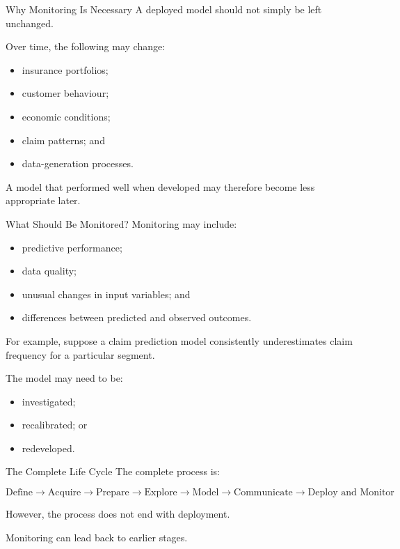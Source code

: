 \documentclass[
  ignorenonframetext,
  aspectratio=169,
]{beamer}
\providecommand{\tightlist}{%
  \setlength{\itemsep}{0pt}\setlength{\parskip}{0pt}}
\begin{document}
\begin{frame}{Why Monitoring Is Necessary}
\protect{}\label{why-monitoring-is-necessary}
A deployed model should not simply be left unchanged.

Over time, the following may change:

\begin{itemize}
\tightlist
\item
  insurance portfolios;
\item
  customer behaviour;
\item
  economic conditions;
\item
  claim patterns; and
\item
  data-generation processes.
\end{itemize}

A model that performed well when developed may therefore become less
appropriate later.
\end{frame}

\begin{frame}{What Should Be Monitored?}
\protect{}\label{what-should-be-monitored}
Monitoring may include:

\begin{itemize}
\tightlist
\item
  predictive performance;
\item
  data quality;
\item
  unusual changes in input variables; and
\item
  differences between predicted and observed outcomes.
\end{itemize}

For example, suppose a claim prediction model consistently
underestimates claim frequency for a particular segment.

The model may need to be:

\begin{itemize}
\tightlist
\item
  investigated;
\item
  recalibrated; or
\item
  redeveloped.
\end{itemize}
\end{frame}

\begin{frame}{The Complete Life Cycle}
\protect{}\label{the-complete-life-cycle}
The complete process is:

\[
\boxed{
\text{Define}
\rightarrow
\text{Acquire}
\rightarrow
\text{Prepare}
\rightarrow
\text{Explore}
\rightarrow
\text{Model}
\rightarrow
\text{Communicate}
\rightarrow
\text{Deploy and Monitor}
}
\]

However, the process does not end with deployment.

Monitoring can lead back to earlier stages.
\end{frame}
\end{document}
